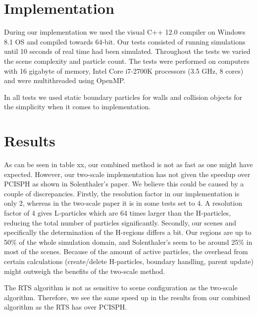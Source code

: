 \documentclass[../../main.tex]{subfiles}
\begin{document}


\section{Implementation}

During our implementation we used the visual C++ 12.0 compiler on Windows 8.1 OS and compiled towards 64-bit. Our tests consisted of running simulations until 10 seconds of real time had been simulated. Throughout the tests we varied the scene complexity and particle count. The tests were performed on computers with 16 gigabyte of memory, Intel Core i7-2700K processors (3.5 GHz, 8 cores) and were multithreaded using OpenMP. 

In all tests we used static boundary particles for walls and collision objects for the simplicity when it comes to implementation. 


\section{Results}

As can be seen in table xx, our combined method is not as fast as one might have expected. However, our two-scale implementation has not given the speedup over PCISPH as shown in Solenthaler's paper. We believe this could be caused by a couple of discrepancies. Firstly, the resolution factor in our implementation is only 2, whereas in the two-scale paper it is in some tests set to 4. A resolution factor of 4 gives L-particles which are 64 times larger than the H-particles, reducing the total number of particles significantly. Secondly, our scenes and specifically the determination of the H-regions differs a bit. Our regions are up to 50\% of the whole simulation domain, and Solenthaler's seem to be around 25\% in most of the scenes. Because of the amount of active particles, the overhead from certain calculations (create/delete H-particles, boundary handling, parent update) might outweigh the benefits of the two-scale method. %

The RTS algorithm is not as sensitive to scene configuration as the two-scale algorithm. 
Therefore, we see the same speed up in the results from our combined algorithm as the RTS has over PCISPH. 
\end{document}
